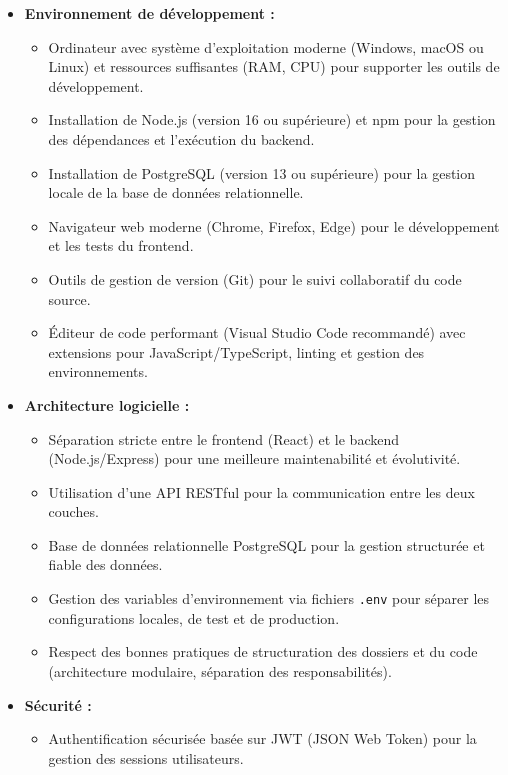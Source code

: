 \documentclass[12pt,a4paper]{report}
\begin{document}
\begin{itemize}
    \item \textbf{Environnement de développement :}
    \begin{itemize}
        \item Ordinateur avec système d’exploitation moderne (Windows, macOS ou Linux) et ressources suffisantes (RAM, CPU) pour supporter les outils de développement.
        \item Installation de Node.js (version 16 ou supérieure) et npm pour la gestion des dépendances et l’exécution du backend.
        \item Installation de PostgreSQL (version 13 ou supérieure) pour la gestion locale de la base de données relationnelle.
        \item Navigateur web moderne (Chrome, Firefox, Edge) pour le développement et les tests du frontend.
        \item Outils de gestion de version (Git) pour le suivi collaboratif du code source.
        \item Éditeur de code performant (Visual Studio Code recommandé) avec extensions pour JavaScript/TypeScript, linting et gestion des environnements.
    \end{itemize}
    \item \textbf{Architecture logicielle :}
    \begin{itemize}
        \item Séparation stricte entre le frontend (React) et le backend (Node.js/Express) pour une meilleure maintenabilité et évolutivité.
        \item Utilisation d’une API RESTful pour la communication entre les deux couches.
        \item Base de données relationnelle PostgreSQL pour la gestion structurée et fiable des données.
        \item Gestion des variables d’environnement via fichiers \texttt{.env} pour séparer les configurations locales, de test et de production.
        \item Respect des bonnes pratiques de structuration des dossiers et du code (architecture modulaire, séparation des responsabilités).
    \end{itemize}
    \item \textbf{Sécurité :}
    \begin{itemize}
        \item Authentification sécurisée basée sur JWT (JSON Web Token) pour la gestion des sessions utilisateurs.

\end{itemize}
\end{itemize}
\end{document}
